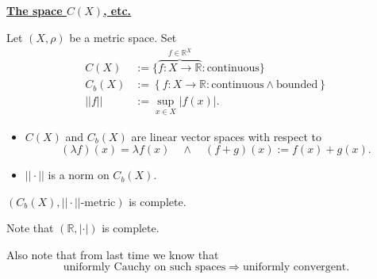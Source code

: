 \documentclass{notes}
\begin{document}
  {\boldmath \bfseries \underline{The space $C(X)$, etc.}}
  
  \begin{defn}
    Let $(X, \rho)$ be a metric space.
    Set 
    \begin{align*}
      C(X) &:= \big \{ \overbrace{f \colon X \to \mathbb R}^{f \in \mathbb R^X} : \text{continuous} \big \} \\ 
      C_b(X) &:= \left \{ f \colon X \to \mathbb R : \text{continuous} \land \text{bounded} \right \} \\ 
      ||f|| &:= \sup_{x \in X} | f(x) |.
    \end{align*}
  \end{defn}
  
  \begin{lem}
    \begin{itemize}
      \item $C(X)$ and $C_b(X)$ are linear vector spaces with respect to 
      \[
        (\lambda f)(x) = \lambda f(x) \quad \land \quad (f + g)(x) := f(x) + g(x).
      \]
      
      \item $|| \cdot ||$ is a norm on $C_b(X)$.
    \end{itemize}
  \end{lem}
  
  \begin{lem}
    $(C_b(X), || \cdot ||\text{-metric})$ is complete.
  \end{lem}
  
  \begin{prf}
    Note that $(\mathbb R, | \cdot |)$ is complete.
    
    Also note that from last time we know that 
    \[
      \text{uniformly Cauchy on such spaces} \Rightarrow \text{uniformly convergent}.
    \]
  \end{prf}
\end{document}
